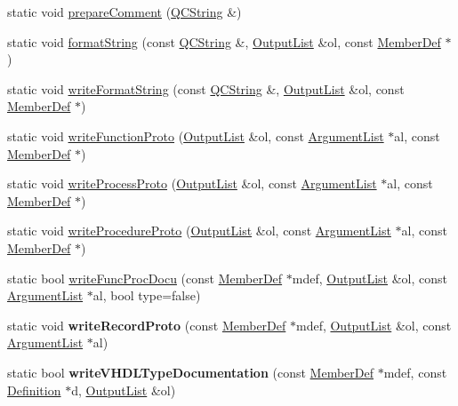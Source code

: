 \begin{DoxyCompactItemize}
\item 
static void \hyperlink{class_vhdl_doc_gen_a9e45941561deb2da7b67dec0e67765bb}{prepare\-Comment} (\hyperlink{class_q_c_string}{Q\-C\-String} \&)
\item 
static void \hyperlink{class_vhdl_doc_gen_aa849b15192ebee6d42eed8d8f1af853a}{format\-String} (const \hyperlink{class_q_c_string}{Q\-C\-String} \&, \hyperlink{class_output_list}{Output\-List} \&ol, const \hyperlink{class_member_def}{Member\-Def} $\ast$)
\item 
static void \hyperlink{class_vhdl_doc_gen_a0167a25254de5522492b684f34ef0381}{write\-Format\-String} (const \hyperlink{class_q_c_string}{Q\-C\-String} \&, \hyperlink{class_output_list}{Output\-List} \&ol, const \hyperlink{class_member_def}{Member\-Def} $\ast$)
\item 
static void \hyperlink{class_vhdl_doc_gen_a555521bd5a3a878e495163bf91ee5183}{write\-Function\-Proto} (\hyperlink{class_output_list}{Output\-List} \&ol, const \hyperlink{class_argument_list}{Argument\-List} $\ast$al, const \hyperlink{class_member_def}{Member\-Def} $\ast$)
\item 
static void \hyperlink{class_vhdl_doc_gen_a9c3dc5f2dbbf02fb5069ccdb24932ff5}{write\-Process\-Proto} (\hyperlink{class_output_list}{Output\-List} \&ol, const \hyperlink{class_argument_list}{Argument\-List} $\ast$al, const \hyperlink{class_member_def}{Member\-Def} $\ast$)
\item 
static void \hyperlink{class_vhdl_doc_gen_a39ad1b0e4466b1c23383a94f534d4161}{write\-Procedure\-Proto} (\hyperlink{class_output_list}{Output\-List} \&ol, const \hyperlink{class_argument_list}{Argument\-List} $\ast$al, const \hyperlink{class_member_def}{Member\-Def} $\ast$)
\item 
static bool \hyperlink{class_vhdl_doc_gen_a6df064ed1e6fbbda5f7c9d27126d62fa}{write\-Func\-Proc\-Docu} (const \hyperlink{class_member_def}{Member\-Def} $\ast$mdef, \hyperlink{class_output_list}{Output\-List} \&ol, const \hyperlink{class_argument_list}{Argument\-List} $\ast$al, bool type=false)
\item 
\hypertarget{class_vhdl_doc_gen_ab538f871c49892142372d7cc7f700ba7}{static void {\bfseries write\-Record\-Proto} (const \hyperlink{class_member_def}{Member\-Def} $\ast$mdef, \hyperlink{class_output_list}{Output\-List} \&ol, const \hyperlink{class_argument_list}{Argument\-List} $\ast$al)}\label{class_vhdl_doc_gen_ab538f871c49892142372d7cc7f700ba7}

\item 
\hypertarget{class_vhdl_doc_gen_a8dbd9143ef6004ef23f16d50be2ba5a5}{static bool {\bfseries write\-V\-H\-D\-L\-Type\-Documentation} (const \hyperlink{class_member_def}{Member\-Def} $\ast$mdef, const \hyperlink{class_definition}{Definition} $\ast$d, \hyperlink{class_output_list}{Output\-List} \&ol)}\label{class_vhdl_doc_gen_a8dbd9143ef6004ef23f16d50be2ba5a5}


\end{DoxyCompactItemize}
